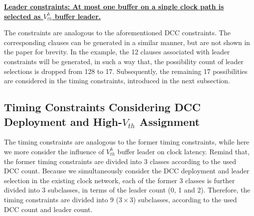 \noindent \textbf{\uline{Leader constraints: At most one buffer on a single clock path is selected as $V_{th}^h$ buffer leader.}}

The constraints are analogous to the aforementioned DCC constraints. The corresponding clauses can be generated in a similar manner, but are not shown in the paper for brevity. In the example, the 12 clauses associated with leader constraints will be generated, in such a way that, the possibility count of leader selections is dropped from 128 to 17. Subsequently, the remaining 17 possibilities are considered in the timing constraints, introduced in the next subsection.

\subsection{Timing Constraints Considering DCC Deployment and High-$V_{th}$ Assignment}
\label{sec:VTA:timing}
The timing constraints are analogous to the former timing constraints, while here we more consider the influence of $V_{th}^h$ buffer leader on clock latency. Remind that, the former timing constraints are divided into 3 classes according to the used DCC count. Because we simultaneously consider the DCC deployment and leader selection in the existing clock network, each of the former 3 classes is further divided into 3 subclasses, in terms of the leader count (0, 1 and 2). Therefore, the timing constraints are divided into 9 ($3 \times 3$) subclasses, according to the used DCC count and leader count.

